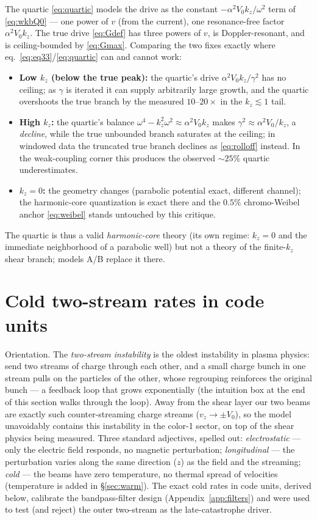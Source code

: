 \documentclass[11pt,a4paper]{article}
\numberwithin{equation}{section}
\theoremstyle{remark}
\newcommand{\Vo}{V_0}
\newcommand{\kz}{k_z}
\begin{document}
The quartic \eqref{eq:quartic} models the drive as the constant
$-\alpha^2\Vo\kz/\omega^2$ term of \eqref{eq:wkbQ0} --- one power of $v$
(from the current), one resonance-free factor $\alpha^2\Vo\kz$. The true
drive \eqref{eq:Gdef} has three powers of $v$, is Doppler-resonant, and is
ceiling-bounded by \eqref{eq:Gmax}. Comparing the two fixes exactly where
eq.~\eqref{eq:eq33}/\eqref{eq:quartic} can and cannot work:
\begin{itemize}
\item \textbf{Low $\kz$ (below the true peak):} the quartic's drive
$\alpha^2\Vo\kz/\gamma^2$ has no ceiling; as $\gamma$ is iterated it can
supply arbitrarily large growth, and the quartic overshoots the true
branch by the measured $10$--$20\times$ in the $\kz\lesssim1$ tail.
\item \textbf{High $\kz$:} the quartic's balance
$\omega^4-\kz^2\omega^2\approx\alpha^2\Vo\kz$ makes
$\gamma^2\approx\alpha^2\Vo/\kz$, a \emph{decline}, while the true
unbounded branch saturates at the ceiling; in windowed data the truncated
true branch declines as \eqref{eq:rolloff} instead. In the weak-coupling
corner this produces the observed ${\sim}25\%$ quartic underestimates.
\item \textbf{$\kz=0$:} the geometry changes (parabolic potential exact,
different channel); the harmonic-core quantization is exact there and the
$0.5\%$ chromo-Weibel anchor \eqref{eq:weibel} stands untouched by this
critique.
\end{itemize}
The quartic is thus a valid \emph{harmonic-core} theory (its own regime:
$\kz=0$ and the immediate neighborhood of a parabolic well) but not a
theory of the finite-$\kz$ shear branch; models A/B replace it there.

\section{Cold two-stream rates in code units}
\label{sec:twostream}

Orientation. The \emph{two-stream instability} is the oldest
instability in plasma physics: send two streams of charge through each
other, and a small charge bunch in one stream pulls on the particles of
the other, whose regrouping reinforces the original bunch --- a
feedback loop that grows exponentially (the intuition box at the end of
this section walks through the loop). Away from the shear layer our two
beams are exactly such counter-streaming charge streams
($v_z\to\pm\Vo$), so the model unavoidably contains this instability in
the color-1 sector, on top of the shear physics being measured. Three
standard adjectives, spelled out: \emph{electrostatic} --- only the
electric field responds, no magnetic perturbation; \emph{longitudinal}
--- the perturbation varies along the same direction ($z$) as the field
and the streaming; \emph{cold} --- the beams have zero temperature, no
thermal spread of velocities (temperature is added in
\S\ref{sec:warm}). The exact cold rates in code units, derived below,
calibrate the bandpass-filter design (Appendix~\ref{app:filters}) and
were used to test (and reject) the outer two-stream as the
late-catastrophe driver.
\end{document}
